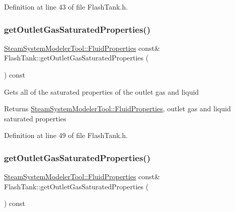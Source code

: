 Definition at line 43 of file Flash\+Tank.\+h.

\mbox{\label{class_flash_tank_a9db00130ed4419e2e251c9e5ce936572}} 
\subsubsection{\texorpdfstring{get\+Outlet\+Gas\+Saturated\+Properties()}{getOutletGasSaturatedProperties()}\hspace{0.1cm}{\footnotesize\ttfamily [1/3]}}
{\footnotesize\ttfamily \hyperlink{struct_steam_system_modeler_tool_1_1_fluid_properties}{Steam\+System\+Modeler\+Tool\+::\+Fluid\+Properties} const\& Flash\+Tank\+::get\+Outlet\+Gas\+Saturated\+Properties (\begin{DoxyParamCaption}{ }\end{DoxyParamCaption}) const\hspace{0.3cm}{\ttfamily [inline]}}

Gets all of the saturated properties of the outlet gas and liquid \begin{DoxyReturn}{Returns}
\hyperlink{struct_steam_system_modeler_tool_1_1_fluid_properties}{Steam\+System\+Modeler\+Tool\+::\+Fluid\+Properties}, outlet gas and liquid saturated properties 
\end{DoxyReturn}


Definition at line 49 of file Flash\+Tank.\+h.

\mbox{\label{class_flash_tank_a9db00130ed4419e2e251c9e5ce936572}} 
\subsubsection{\texorpdfstring{get\+Outlet\+Gas\+Saturated\+Properties()}{getOutletGasSaturatedProperties()}\hspace{0.1cm}{\footnotesize\ttfamily [2/3]}}
{\footnotesize\ttfamily \hyperlink{struct_steam_system_modeler_tool_1_1_fluid_properties}{Steam\+System\+Modeler\+Tool\+::\+Fluid\+Properties} const\& Flash\+Tank\+::get\+Outlet\+Gas\+Saturated\+Properties (\begin{DoxyParamCaption}{ }\end{DoxyParamCaption}) const\hspace{0.3cm}{\ttfamily [inline]}}

